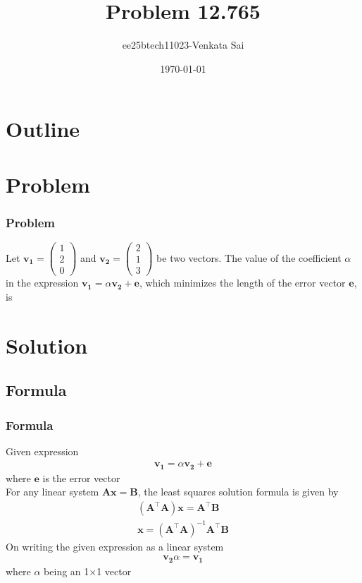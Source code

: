 \documentclass{beamer}
\title{Problem 12.765}
\author{ee25btech11023-Venkata Sai}
\date{\today}
\providecommand{\brak}[1]{\ensuremath{\left(#1\right)}}
\theoremstyle{remark}
\newcommand{\myvec}[1]{\ensuremath{\begin{pmatrix}#1\end{pmatrix}}}
\let\vec\mathbf
\numberwithin{equation}{section}
\begin{document}
\begin{frame}
\titlepage
\end{frame}

\section*{Outline}
\begin{frame}
\tableofcontents
\end{frame}

\section{Problem}

\begin{frame}
\frametitle{Problem}
Let $\vec{v_1}=\myvec{1\\2\\0}$ and $\vec{v_2}=\myvec{2\\1\\3}$ be two vectors. The value of the coefficient $\alpha$ in the
expression $\vec{v_1} = \alpha \vec{v_2} +\vec{e}$, which minimizes the length of the error vector $\vec{e}$, is
\end{frame}
\section{Solution}


\subsection{Formula}
\begin{frame}
\frametitle{Formula}
Given expression
\begin{align}
    \vec{v_1} = \alpha \vec{v_2} +\vec{e}
\end{align}
where $\vec{e}$ is the error vector\\
 For any linear system $\vec{A}\vec{x}=\vec{B}$, the least squares solution formula is given by
 \begin{align}
     \brak{\vec{A}^\top\vec{A}}\vec{x}=\vec{A}^\top\vec{B} \\
     \vec{x}= \brak{\vec{A}^\top\vec{A}}^{-1}\vec{A}^\top\vec{B}
 \end{align}
 On writing the given expression as a linear system
 \begin{align}
     \vec{v_2}\alpha =\vec{v_1}
 \end{align}
 where $\alpha$ being an 1$\times$1 vector
\end{frame}
\end{document}
